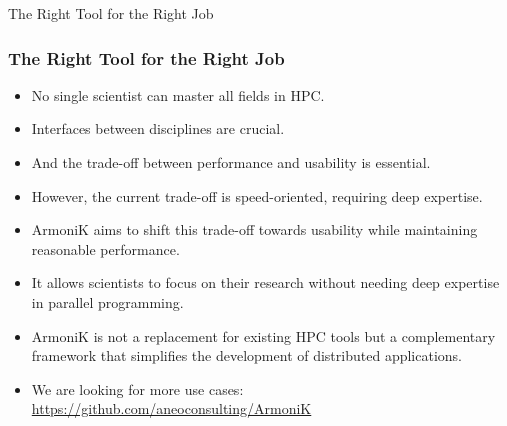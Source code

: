 \documentclass[10pt,aspectratio=1609]{beamer}
\begin{document}
\begin{section}{The Right Tool for the Right Job}
 \begin{frame}
   \frametitle{The Right Tool for the Right Job}
   \begin{itemize}
     \item No single scientist can master all fields in HPC.
     \item Interfaces between disciplines are crucial.
     \item And the trade-off between performance and usability is essential.
     \item However, the current trade-off is speed-oriented, requiring deep expertise.
     \item ArmoniK aims to shift this trade-off towards usability while maintaining reasonable performance.
     \item It allows scientists to focus on their research without needing deep expertise in parallel programming.
     \item ArmoniK is not a replacement for existing HPC tools but a complementary framework that simplifies the development of distributed applications.
     \item We are looking for more use cases: \url{https://github.com/aneoconsulting/ArmoniK}
   \end{itemize}
 \end{frame}


\end{section}
\end{document}
